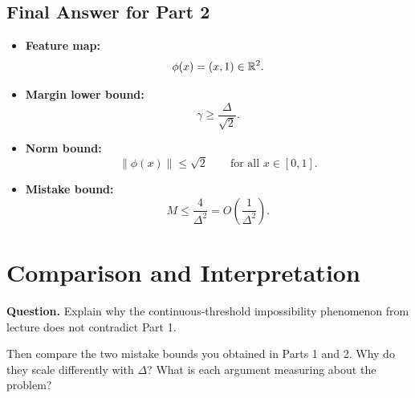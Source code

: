 \documentclass{article}
\begin{document}
\begin{solutionbox}
\subsection*{Final Answer for Part 2}

\begin{itemize}[leftmargin=2.5em]
    \item \textbf{Feature map:}
    \[
    \phi(x)=(x,1)\in\mathbb{R}^2.
    \]

    \item \textbf{Margin lower bound:}
    \[
    \gamma \ge \frac{\Delta}{\sqrt{2}}.
    \]

    \item \textbf{Norm bound:}
    \[
    \|\phi(x)\|\le \sqrt{2}
    \qquad \text{for all } x\in[0,1].
    \]

    \item \textbf{Mistake bound:}
    \[
    M\le \frac{4}{\Delta^2}
    =
    O\!\left(\frac{1}{\Delta^2}\right).
    \]
\end{itemize}

\end{solutionbox}

\section{Comparison and Interpretation}

\textbf{Question.}
\newline
Explain why the continuous-threshold impossibility phenomenon from lecture does
not contradict Part 1.

Then compare the two mistake bounds you obtained in Parts 1 and 2. Why do they
scale differently with $\Delta$? What is each argument measuring about the
problem?
\end{document}
